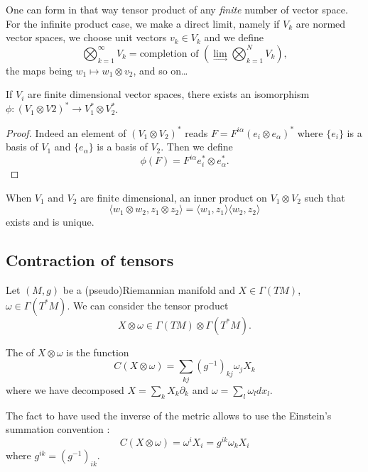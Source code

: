 One can form in that way tensor product of any \emph{finite} number of vector space. For the infinite product case, we make a direct limit, namely if $V_k$ are normed vector spaces, we choose unit vectors $v_k\in V_k$ and we define
\begin{equation}
\bigotimes_{k=1}^{\infty} V_k=\text{completion of }\left(\lim_{\rightarrow}\bigotimes_{k=1}^N V_k\right),
\end{equation}
the maps being $w_1\mapsto w_1\otimes v_2$, and so on\ldots

\begin{lemma}
If $V_i$ are finite dimensional vector spaces, there exists an isomorphism $\phi\colon (V_1\otimes V2)^*\to V_1^*\otimes V_2^*$. 
\end{lemma}
\begin{proof}
Indeed an element of $(V_1\otimes V_2)^*$ reads $F=F^{i\alpha}(e_i\otimes e_{\alpha})^*$ where $\{ e_i \}$ is a basis of $V_1$ and $\{ e_{\alpha} \}$ is a basis of $V_2$. Then we define
\[ 
  \phi(F)=F^{i\alpha}e_i^*\otimes e_{\alpha}^*.
\]
\end{proof}

\begin{lemma}
When $V_1$ and $V_2$ are finite dimensional, an inner product on $V_1\otimes V_2$ such that
\[ 
  \langle w_1\otimes w_2, z_1\otimes z_2\rangle =\langle w_1, z_1\rangle \langle w_2, z_2\rangle 
\]
exists and is unique.
\end{lemma}

\subsection{Contraction of tensors}

Let \( (M,g)\) be a (pseudo)Riemannian manifold and \( X\in\Gamma(TM)\), \( \omega\in\Gamma(T^*M)\). We can consider the tensor product
\begin{equation}
    X\otimes \omega\in \Gamma(TM)\otimes \Gamma(T^*M).
\end{equation}
\begin{definition}
    The  of \( X\otimes \omega\) is the function
    \begin{equation}
        C(X\otimes \omega)=\sum_{kj}(g^{-1})_{kj}\omega_jX_k
    \end{equation}
    where we have decomposed \( X=\sum_kX_k\partial_k\) and \( \omega=\sum_l\omega_ldx_l  \).
\end{definition}
The fact to have used the inverse of the metric allows to use the Einstein's summation convention : 
\begin{equation}
    C(X\otimes \omega)=\omega^iX_i=g^{ik}\omega_kX_i
\end{equation}
where \( g^{ik}=(g^{-1})_{ik}\).

